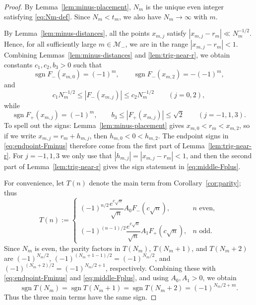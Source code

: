\documentclass[reqno]{amsart}
\theoremstyle{definition}
\theoremstyle{plain}
\theoremstyle{remark}
\numberwithin{equation}{section}
\newcommand{\sgn}{\operatorname{sgn}}
\begin{document}
\begin{proof}
By Lemma~\ref{lem:minus-placement}, $N_m$ is the unique even integer satisfying \eqref{eq:Nm-def}. Since $N_m<t_m$, we also have $N_m\to\infty$ with $m$.

By Lemma~\ref{lem:minus-distances}, all the points $x_{m,j}$ satisfy $|x_{m,j}-r_m|\ll N_m^{-1/2}$. Hence, for all sufficiently large $m\in\mathcal M_-$, we are in the range $|x_{m,j}-r_m|<1$. Combining Lemmas~\ref{lem:minus-distances} and \ref{lem:trig-near-r}, we obtain constants $c_1,c_2,b_3>0$ such that
\begin{equation}\label{eq:endpoint-Fminus}
  \sgn F_-(x_{m,0})=(-1)^m,
  \qquad
  \sgn F_-(x_{m,2})=-(-1)^m,
\end{equation}
and
\begin{equation}\label{eq:endpoint-size}
  c_1N_m^{-1/2}\le |F_-(x_{m,j})|\le c_2N_m^{-1/2}
  \qquad (j=0,2),
\end{equation}
while
\begin{equation}\label{eq:middle-Fplus}
  \sgn F_+(x_{m,j})=(-1)^m,
  \qquad
  b_3\le |F_+(x_{m,j})|\le \sqrt 2
  \qquad (j=-1,1,3).
\end{equation}
To spell out the signs: Lemma~\ref{lem:minus-placement} gives $x_{m,0}<r_m<x_{m,2}$, so if we write $x_{m,j}=r_m+h_{m,j}$, then $h_{m,0}<0<h_{m,2}$. The endpoint signs in \eqref{eq:endpoint-Fminus} therefore come from the first part of Lemma~\ref{lem:trig-near-r}. For $j=-1,1,3$ we only use that $|h_{m,j}|=|x_{m,j}-r_m|<1$, and then the second part of Lemma~\ref{lem:trig-near-r} gives the sign statement in \eqref{eq:middle-Fplus}.

For convenience, let $T(n)$ denote the main term from Corollary~\ref{cor:parity}; thus
\[
  T(n):=
  \begin{cases}
    (-1)^{n/2}\dfrac{e^{c\sqrt n}}{\sqrt n}A_0F_-(c\sqrt n),& n \text{ even},\\[1.2ex]
    (-1)^{(n-1)/2}\dfrac{e^{c\sqrt n}}{\sqrt n}A_1F_+(c\sqrt n),& n \text{ odd}.
  \end{cases}
\]
Since $N_m$ is even, the parity factors in $T(N_m)$, $T(N_m+1)$, and $T(N_m+2)$ are $(-1)^{N_m/2}$, $(-1)^{(N_m+1-1)/2}=(-1)^{N_m/2}$, and $(-1)^{(N_m+2)/2}=(-1)^{N_m/2+1}$, respectively. Combining these with \eqref{eq:endpoint-Fminus} and \eqref{eq:middle-Fplus}, and using $A_0,A_1>0$, we obtain
\[
  \sgn T(N_m)=\sgn T(N_m+1)=\sgn T(N_m+2)=(-1)^{N_m/2+m}.
\]
Thus the three main terms have the same sign.


\end{proof}
\end{document}
